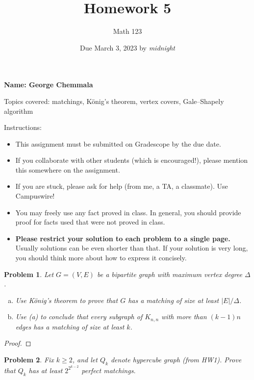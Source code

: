 \documentclass[11pt]{article}
\author{Math 123}
\date{Due March 3, 2023 by \emph{midnight} }
\title{Homework 5}
\newtheorem{problem}{Problem}
\begin{document}
\maketitle

{\bf\Large Name: George Chemmala} 


\vspace{.3in}
Topics covered: matchings, K\"onig's theorem, vertex covers, Gale--Shapely algorithm 

Instructions: 
\begin{itemize}
\item This assignment must be submitted on Gradescope by the due date. 
\item If you collaborate with other students (which is encouraged!), please mention this somewhere on the assignment. 
\item If you are stuck, please ask for help (from me, a TA, a classmate). Use Campuswire!  
\item You may freely use any fact proved in class. In general, you should provide proof for facts used that were not proved in class. 
\item {\bf Please restrict your solution to each problem to a single page.} Usually solutions can be even shorter than that. If your solution is very long, you should think more about how to express it concisely.
\end{itemize}

\pagebreak 



\begin{problem}
Let $G=(V,E)$ be a bipartite graph with maximum vertex degree $\Delta$. \begin{enumerate}[(a)]
\item Use K\"onig's theorem to prove that $G$ has a matching of size at least $|E|/\Delta$. 
\item Use (a) to conclude that every subgraph of $K_{n,n}$ with more than $(k-1)n$ edges has a matching of size at least $k$. 
\end{enumerate} 
\end{problem}

\begin{proof}

\end{proof}

\pagebreak



\begin{problem}
Fix $k\ge2$, and let $Q_k$ denote hypercube graph (from HW1). Prove that $Q_k$ has at least $2^{2^{k-2}}$ perfect matchings.
\end{problem}
\end{document}
